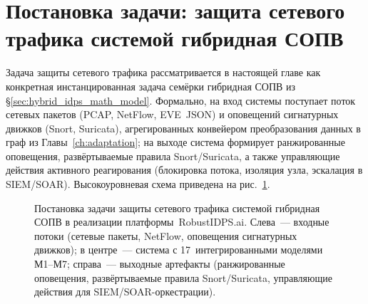 \section{Постановка задачи: защита сетевого трафика системой гибридная СОПВ}
\label{sec:platform_problem_statement}

Задача защиты сетевого трафика рассматривается в настоящей главе как
конкретная инстанцированная задача семёрки гибридная СОПВ из
\S\ref{sec:hybrid_idps_math_model}. Формально, на вход системы
поступает поток сетевых пакетов (PCAP, NetFlow, EVE~JSON) и
оповещений сигнатурных движков (Snort, Suricata), агрегированных
конвейером преобразования данных в граф из
Главы~\ref{ch:adaptation}; на выходе система формирует
ранжированные оповещения, развёртываемые правила Snort/Suricata,
а также управляющие действия активного реагирования (блокировка
потока, изоляция узла, эскалация в SIEM/SOAR). Высокоуровневая
схема приведена на рис.~\ref{fig:platform_problem_box}.

\begin{figure}[htbp]
\centering
{}
\caption{Постановка задачи защиты сетевого трафика системой
гибридная СОПВ в реализации платформы~\textsf{RobustIDPS.ai}. Слева~---
входные потоки (сетевые пакеты, NetFlow, оповещения сигнатурных
движков); в центре~--- система с 17~интегрированными моделями
М1--М7; справа~--- выходные артефакты (ранжированные оповещения,
развёртываемые правила Snort/Suricata, управляющие действия для
SIEM/SOAR-оркестрации).}
\label{fig:platform_problem_box}
\end{figure}

